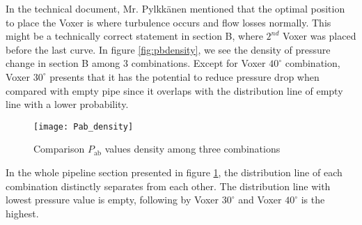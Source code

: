 In the technical document, Mr. Pylkkänen mentioned that the optimal position to place the Voxer is where turbulence occurs and flow losses normally. This might be a technically correct statement in section B, where $2^{nd}$ Voxer was placed before the last curve. In figure \ref{fig:pbdensity}, we see the density of pressure change in section B among 3 combinations. Except for Voxer $40^{\circ}$ combination, Voxer $30^{\circ}$ presents that it has the potential to reduce pressure drop when compared with empty pipe since it overlaps with the distribution line of empty line with a lower probability.  

\begin{figure}[h]
  \centering
  \texttt{[image: Pab\_density]}
  \caption{ Comparison $P_{\text{ab}}$ values density among three combinations}
  \label{fig:pabdensity}
\end{figure}

In the whole pipeline section presented in figure \ref{fig:pabdensity}, the distribution line of each combination distinctly separates from each other. The distribution line with lowest pressure value is empty, following by Voxer $30^{\circ}$ and Voxer $40^{\circ}$  is the highest.
\clearpage %
